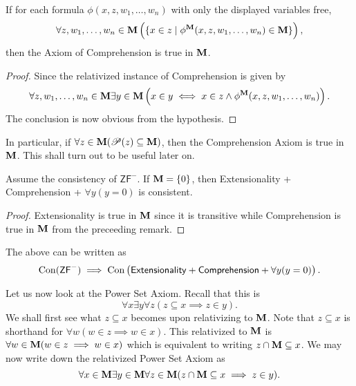 \begin{lemma}
    If for each formula $\phi(x,z,w_1,\dots,w_n)$ with only the displayed variables free, 
    \begin{equation*}
        \forall z,w_1,\dots,w_n\in\mathbf{M}\left(\{x\in z\mid \phi^{\mathbf{M}}(x,z,w_1,\dots,w_n)\in\mathbf{M}\}\right),
    \end{equation*}
    then the Axiom of Comprehension is true in $\mathbf{M}$.
\end{lemma}
\begin{proof}
    Since the relativized instance of Comprehension is given by 
    \begin{equation*}
        \forall z,w_1,\dots,w_n\in\mathbf{M}\exists y\in\mathbf{M}\left(x\in y\iff x\in z\wedge\phi^{\mathbf{M}}(x,z,w_1,\dots,w_n)\right).
    \end{equation*}
    The conclusion is now obvious from the hypothesis.
\end{proof}
\begin{remark}
    In particular, if $\forall z\in\mathbf{M}(\mathscr P(z)\subseteq\mathbf{M})$, then the Comprehension Axiom is true in $\mathbf{M}$. This shall turn out to be useful later on.
\end{remark}

\begin{theorem}
    Assume the consistency of $\mathsf{ZF}^-$. If $\mathbf{M} = \{0\}$, then Extensionality + Comprehension + $\forall y(y = 0)$ is consistent.
\end{theorem}
\begin{proof}
    Extensionality is true in $\mathbf{M}$ since it is transitive while Comprehension is true in $\mathbf{M}$ from the preceeding remark. 
\end{proof}

The above can be written as 
\begin{equation*}
    \operatorname{Con}(\mathsf{ZF}^-)\implies\operatorname{Con}\left(\mathsf{Extensionality} + \mathsf{Comprehension} + \forall y(y = 0)\right).
\end{equation*}

Let us now look at the Power Set Axiom. Recall that this is 
\begin{equation*}
    \forall x\exists y\forall z(z\subseteq x\implies z\in y).
\end{equation*}
We shall first see what $z\subseteq x$ becomes upon relativizing to $\mathbf{M}$. Note that $z\subseteq x$ is shorthand for $\forall w(w\in z\implies w\in x)$. This relativized to $\mathbf{M}$ is $\forall w\in\mathbf{M}(w\in z\implies w\in x)$ which is equivalent to writing $z\cap\mathbf{M}\subseteq x$. We may now write down the relativized Power Set Axiom as 
\begin{equation*}
    \forall x\in\mathbf{M}\exists y\in\mathbf{M}\forall z\in\mathbf{M}(z\cap\mathbf{M}\subseteq x\implies z\in y).
\end{equation*}

